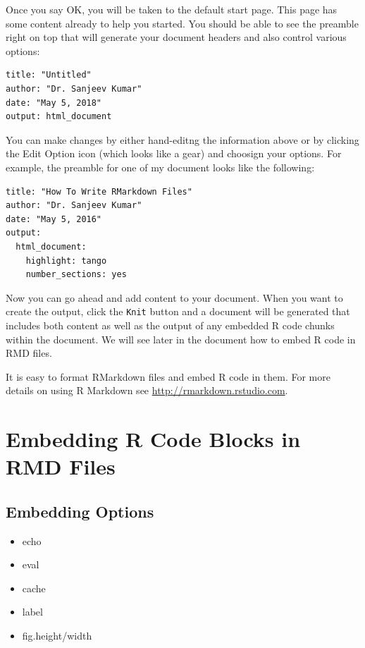 \documentclass[]{krantz}
\providecommand{\tightlist}{%
  \setlength{\itemsep}{0pt}\setlength{\parskip}{0pt}}
\begin{document}
Once you say OK, you will be taken to the default start page. This page
has some content already to help you started. You should be able to see
the preamble right on top that will generate your document headers and
also control various options:

\begin{verbatim}
title: "Untitled"
author: "Dr. Sanjeev Kumar"
date: "May 5, 2018"
output: html_document
\end{verbatim}

You can make changes by either hand-editng the information above or by
clicking the Edit Option icon (which looks like a gear) and choosign
your options. For example, the preamble for one of my document looks
like the following:

\begin{verbatim}
title: "How To Write RMarkdown Files"
author: "Dr. Sanjeev Kumar"
date: "May 5, 2016"
output:
  html_document: 
    highlight: tango
    number_sections: yes
\end{verbatim}

Now you can go ahead and add content to your document. When you want to
create the output, click the \texttt{Knit} button and a document will be
generated that includes both content as well as the output of any
embedded R code chunks within the document. We will see later in the
document how to embed R code in RMD files.

It is easy to format RMarkdown files and embed R code in them. For more
details on using R Markdown see \url{http://rmarkdown.rstudio.com}.

\section{Embedding R Code Blocks in RMD
Files}\label{embedding-r-code-blocks-in-rmd-files}

\subsection{Embedding Options}\label{embedding-options}

\begin{itemize}
\tightlist
\item
  echo
\item
  eval
\item
  cache
\item
  label
\item
  fig.height/width
\end{itemize}
\end{document}
